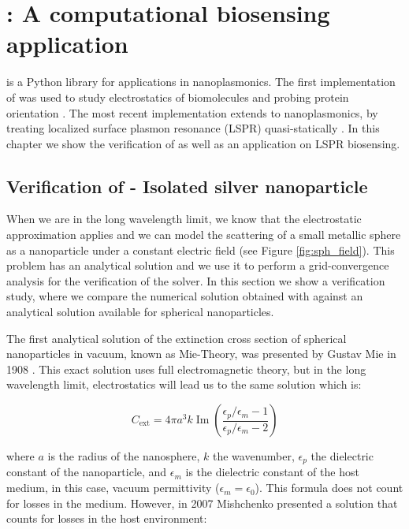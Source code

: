 \chapter{\pygbelspr: A computational biosensing application} \label{chap:pygbe-lspr}
\graphicspath{{pygbe_lspr_bio/figs/}}

\pygbelspr \cite{ClementiETal2017} is a Python library for applications in 
nanoplasmonics. The first implementation of \pygbe \cite{CooperETal2016} was used to study electrostatics 
of biomolecules \cite{CooperBardhanBarba2013} and probing protein orientation \cite{CooperClementiBarba2015}. The 
most recent implementation extends \pygbe to nanoplasmonics, by treating localized surface plasmon resonance (LSPR) 
quasi-statically \cite{MayergoyzZhang2007}. In this chapter we show the verification of \pygbelspr as well as an 
application on LSPR biosensing. 

\section{Verification of \pygbe - Isolated silver nanoparticle } \label{sec:verification}

When we are in the long wavelength limit, we know that the electrostatic approximation 
applies and we can model the scattering of a small metallic sphere as a nanoparticle 
under a constant electric field (see Figure \ref{fig:sph_field}). This problem 
has an analytical solution and we use it to perform a grid-convergence analysis for 
the verification of the \pygbe solver. In this section we show a verification study, where 
we compare the numerical solution obtained with \pygbe against an analytical solution available 
for spherical nanoparticles. 

The first analytical solution of the extinction cross section of spherical 
nanoparticles in vacuum, known as Mie-Theory, was presented by Gustav Mie in 1908
\cite{Mie1908}. This exact solution uses full electromagnetic theory, but in the 
long wavelength limit, electrostatics will lead us to the same solution 
\cite{BohrenHuffman1983} which is:

\begin{equation} \label{eq:Cext_analytical}
    C_\text{ext} = 4\pi a^3 k \operatorname{Im}\left(\frac{\epsilon_p/\epsilon_m -1}{\epsilon_p/\epsilon_m -2}\right)
\end{equation}

where $a$ is the radius of the nanosphere, $k$ the wavenumber, 
$\epsilon_p$ the dielectric constant of the nanoparticle, and $\epsilon_m$ is the
dielectric constant of the host medium, in this case,  vacuum permittivity
($\epsilon_m = \epsilon_0$).  This formula does not count for losses in the medium.
However, in 2007 Mishchenko \cite{Mishchenko2007} presented a solution that counts for losses in
the host environment:

